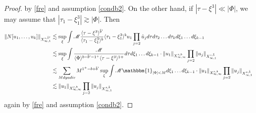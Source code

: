 \documentclass[a4paper, 11pt]{amsart}
\newcommand{\jap}[1]{\langle #1 \rangle}
\theoremstyle{plain}
\theoremstyle{definition}
\theoremstyle{remark}
\newcommand{\5}{\text{V}}
\numberwithin{equation}{section}
\theoremstyle{mytheoremstyle} \newtheorem{nota}[thm]{Remark}
\theoremstyle{mytheoremstyle} \newtheorem{exemplo}[thm]{Example}
\begin{document}
\begin{proof}
    by \eqref{fre} and assumption \eqref{condb2}. On the other hand, if $|\tau-\xi^3|\ll |\Phi|$, we may assume that $|\tau_1-\xi_1^3|\gtrsim |\Phi|$. Then
      \begin{align}
        \|N[u_1,\dots,u_k]\|_{X^{s,\tilde{b}'}_{\infty,1}} &\lesssim \sup_\xi \int \mathcal{M} \frac{\jap{\tau-\xi^3}^{\tilde{b}'}}{\jap{\tau_1-\xi_1^3}^b} \jap{\tau_1-\xi_1^3}^bu_1 \prod_{j=2} \hat{u}_j d\tau d\tau_2\dots d\tau_k d\xi_1\dots d\xi_{k-1} \\&\lesssim \sup_\xi \int \frac{\mathcal{M}}{\jap{\Phi}^{b-\tilde{b}'-1^+}\jap{\tau-\xi^3}^{1+} } d\tau d\xi_1\dots d\xi_{k-1} \cdot \|u_1\|_{X^{s,b}_{\infty,\infty}} \prod_{j=2} \|u_j\|_{X^{s,\tilde{b}}_{\infty,1}} \\&\lesssim \sum_{M dyadic} M^{1^+-b+\tilde{b}'} \sup_\xi \int \mathcal{M} \mathbbm{1}_{|\Phi|<M} d\xi_1\dots d\xi_{k-1} \cdot \|u_1\|_{X^{s,b}_{\infty,\infty}} \prod_{j=2} \|u_j\|_{X^{s,\tilde{b}}_{\infty,1}}\\& \lesssim\|u_1\|_{X^{s,b}_{\infty,\infty}} \prod_{j=2} \|u_j\|_{X^{s,\tilde{b}}_{\infty,1}}
    \end{align}
    again by \eqref{fre} and assumption \eqref{condb2}.
\end{proof}
\end{document}
